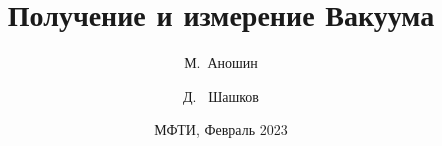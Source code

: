 \documentclass[xcolor=table]{beamer}
\title[Получение и измерение Вакуума] %
{Получение и измерение Вакуума}
\author[Аношин, Шашков] 
{М.~Аношин\inst{1} \and Д. ~Шашков\inst{1}}
\date[18.02.2023] 
{МФТИ, Февраль 2023}
\begin{document}
\frame{\titlepage}


\end{document}
